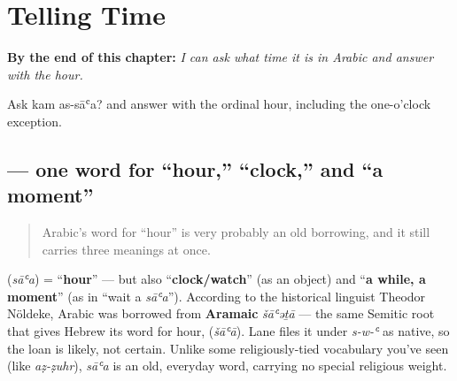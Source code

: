 
\chapter{Telling Time}
\label{ch:ar-telling-time}

\begin{chapteropening}
\textbf{By the end of this chapter:} \emph{I can ask what time it is in Arabic and answer with the hour.}

Ask kam as-sāʿa? and answer with the ordinal hour, including the one-o'clock exception.
\end{chapteropening}

\section[\texorpdfstring{\ar{الساعة} (as-sāʿa)}{الساعة (as-sāʿa)}]{ — one word for \textquotedblleft{}hour,\textquotedblright{} \textquotedblleft{}clock,\textquotedblright{} and \textquotedblleft{}a moment\textquotedblright{}}

\label{lesson:AR-C16-al-saa}



\begin{quote}
Arabic's word for \textquotedblleft{}hour\textquotedblright{} is very probably an old borrowing, and it still carries three meanings at once.
\end{quote}

\begin{culture}
\textbf{} (\emph{sāʿa}) = \textquotedblleft{}\textbf{hour}\textquotedblright{} — but also \textquotedblleft{}\textbf{clock/watch}\textquotedblright{} (as an object) and \textquotedblleft{}\textbf{a while, a moment}\textquotedblright{} (as in \textquotedblleft{}wait a \emph{sāʿa}\textquotedblright{}). According to the historical linguist Theodor Nöldeke, Arabic \textbf{} was borrowed from \textbf{Aramaic} \emph{šāʿəṯā} — the same Semitic root that gives Hebrew its word for hour, \textbf{} (\emph{šāʿā}). Lane files it under \emph{s-w-ʿ} as native, so the loan is likely, not certain. Unlike some religiously-tied vocabulary you've seen (like \emph{aẓ-ẓuhr}), \emph{sāʿa} is an old, everyday word, carrying no special religious weight.
\end{culture}

